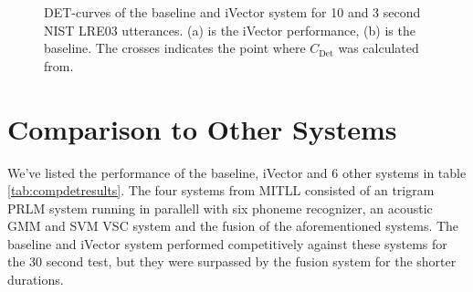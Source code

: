\begin{figure}[hbt!]
	\begin{center}
	\end{center}
	\caption{DET-curves of the baseline and iVector system for 10 and 3 second NIST LRE03 utterances. (a) is the iVector performance, (b) is the baseline. The crosses indicates the point where $C_{\text{Det}}$ was calculated from.}
	\label{fig:sysdetshort}
\end{figure}
 
\section{Comparison to Other Systems}

We've listed the performance of the baseline, iVector and 6 other systems in table \ref{tab:compdetresults}. The four systems from MITLL consisted of an trigram PRLM system running in parallell with six phoneme recognizer, an acoustic GMM and SVM VSC system and the fusion of the aforementioned systems. The baseline and iVector system performed competitively against these systems for the 30 second test, but they were surpassed by the fusion system for the shorter durations. 

